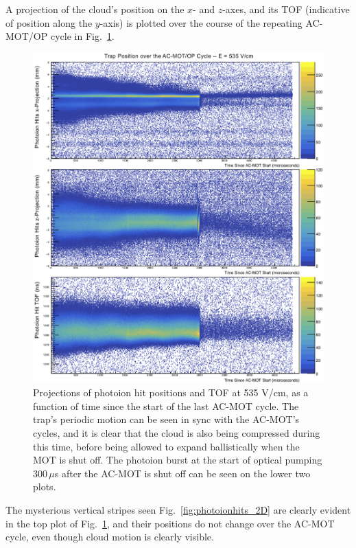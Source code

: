 A projection of the cloud's position on the $x$- and $z$-axes, and its \ac{TOF} (indicative of position along the $y$-axis) is plotted over the course of the repeating \ac{AC-MOT}/\ac{OP} cycle in Fig.~\ref{fig:position_v_acmottime_3axes}. 
%
\begin{figure}[h!t!b!!!!!]
	\centering
	\includegraphics[width=.99\linewidth]
	{Figures/rMCP_xyz_vs_acmottime.png}
	\caption[Photoion Hit Positions at 535 V/cm, as a function of AC-MOT Time]{Projections of photoion hit positions and \ac{TOF} at 535 V/cm, as a function of time since the start of the last \ac{AC-MOT} cycle.  The trap's periodic motion can be seen in sync with the \ac{AC-MOT}'s cycles, and it is clear that the cloud is also being compressed during this time, before being allowed to expand ballistically when the MOT is shut off.  The photoion burst at the start of optical pumping 300$\,\mu$s after the AC-MOT is shut off can be seen on the lower two plots.  
	}	
	\label{fig:position_v_acmottime_3axes}
\end{figure}
\FloatBarrier
%

\noindent
The mysterious vertical stripes seen Fig.~\ref{fig:photoionhits_2D} are clearly evident in the top plot of
Fig.~\ref{fig:position_v_acmottime_3axes}, and their positions do not change over the AC-MOT cycle, even though cloud motion is clearly visible.  
 
